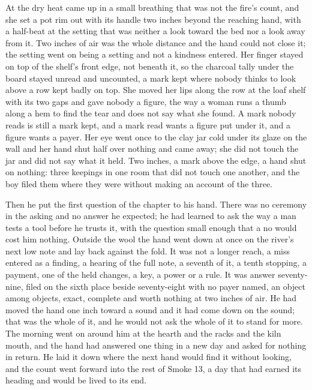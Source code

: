 \scenebreak

At  the dry heat came up in a small breathing that was not the fire's count, and she set a pot rim out with its handle two inches beyond the reaching hand, with a half-beat at the setting that was neither a look toward the bed nor a look away from it. Two inches of air was the whole distance and the hand could not close it; the setting went on being a setting and not a kindness entered. Her finger stayed on top of the shelf's front edge, not beneath it, so the charcoal tally under the board stayed unread and uncounted, a mark kept where nobody thinks to look above a row kept badly on top. She moved her lips along the row at the loaf shelf with its two gaps and gave nobody a figure, the way a woman runs a thumb along a hem to find the tear and does not say what she found. A mark nobody reads is still a mark kept, and a mark read wants a figure put under it, and a figure wants a payer. Her eye went once to the clay jar cold under its glaze on the wall and her hand shut half over nothing and came away; she did not touch the jar and did not say what it held. Two inches, a mark above the edge, a hand shut on nothing: three keepings in one room that did not touch one another, and the boy filed them where they were without making an account of the three.

Then he put the first question of the chapter to his hand. There was no ceremony in the asking and no answer he expected; he had learned to ask the way a man tests a tool before he trusts it, with the question small enough that a no would cost him nothing. Outside the wool the hand went down at once on the river's next low note and lay back against the fold. It was not a longer reach, a miss entered as a finding, a hearing of the full note, a seventh of it, a tenth stopping, a payment, one of the held changes, a key, a power or a rule. It was answer seventy-nine, filed on the sixth place beside seventy-eight with no payer named, an object among objects, exact, complete and worth nothing at two inches of air. He had moved the hand one inch toward a sound and it had come down on the sound; that was the whole of it, and he would not ask the whole of it to stand for more. The morning went on around him at the hearth and the racks and the kiln mouth, and the hand had answered one thing in a new day and asked for nothing in return. He laid it down where the next hand would find it without looking, and the count went forward into the rest of Smoke 13, a day that had earned its heading and would be lived to its end.

